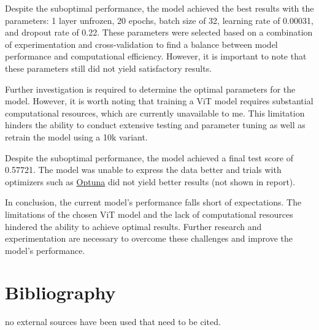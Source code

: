 \documentclass{article}
\begin{document}
Despite the suboptimal performance, the model achieved the best results with the parameters: 1 layer unfrozen, 20 epochs, batch size of 32, learning rate of 0.00031, and dropout rate of 0.22. These parameters were selected based on a combination of experimentation and cross-validation to find a balance between model performance and computational efficiency. However, it is important to note that these parameters still did not yield satisfactory results.

Further investigation is required to determine the optimal parameters for the model. However, it is worth noting that training a ViT model requires substantial computational resources, which are currently unavailable to me. This limitation hinders the ability to conduct extensive testing and parameter tuning as well as retrain the model using a 10k variant. 

Despite the suboptimal performance, the model achieved a final test score of 0.57721. The model was unable to express the data better and trials with optimizers such as \href{https://optuna.org/}{Optuna} did not yield better results (not shown in report).

In conclusion, the current model's performance falls short of expectations. The limitations of the chosen ViT model and the lack of computational resources hindered the ability to achieve optimal results. Further research and experimentation are necessary to overcome these challenges and improve the model's performance.

\newpage
\section{Bibliography}




no external sources have been used that need to be cited. 
\end{document}
